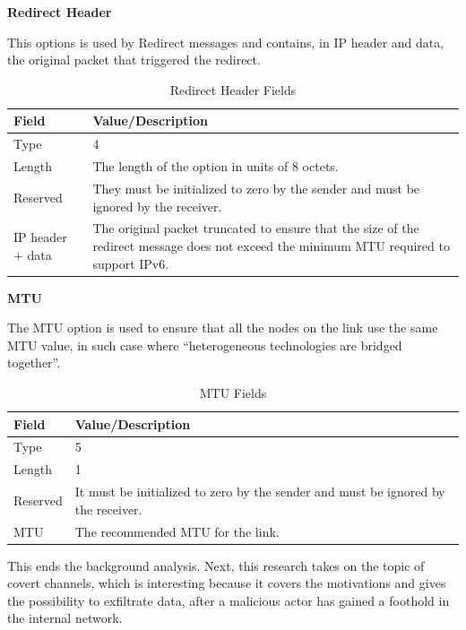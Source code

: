 \documentclass[12pt]{article}
\begin{document}
\textbf{Redirect Header}

This options is used by Redirect messages and contains, in IP header and data, the original packet that triggered the redirect.

\begin{savenotes}
\begin{table}[!htpb]
\centering
\addtolength{\tabcolsep}{3pt}
\begin{tabular}{|L{3.0cm}|L{12.0cm}|}
\hline
Field&Value/Description\\
\hline
Type&4\\
\hline
Length&The length of the option in units of 8 octets.\\
\hline
Reserved&They must be initialized to zero by the sender and must be ignored by the receiver.\\
\hline
IP header + data&The original packet truncated to ensure that the size of the redirect message does not exceed the minimum MTU required to support IPv6.\\
\hline
\end{tabular}
\caption{Redirect Header Fields}
\label{table:redirHead}
\end{table}
\end{savenotes}

\textbf{MTU}

The MTU option is used to ensure that all the nodes on the link use the same MTU value, in such case where ``heterogeneous technologies are bridged together''.

\begin{savenotes}
\begin{table}[!htpb]
\centering
\addtolength{\tabcolsep}{3pt}
\begin{tabular}{|L{3.0cm}|L{12.0cm}|}
\hline
Field&Value/Description\\
\hline
Type&5\\
\hline
Length&1\\
\hline
Reserved&It must be initialized to zero by the sender and must be ignored by the receiver.\\
\hline
MTU&The recommended MTU for the link.\\
\hline
\end{tabular}
\caption{MTU Fields}
\label{table:mtu}
\end{table}
\end{savenotes}


This ends the background analysis. Next, this research takes on the topic of covert channels, which is interesting because it covers the motivations and gives the possibility to exfiltrate data, after a malicious actor has gained a foothold in the internal network.
\end{document}
